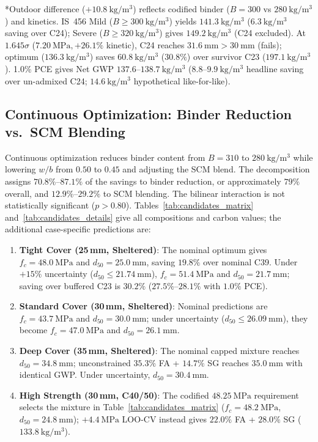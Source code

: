 \documentclass[journal]{IEEEtran}
\begin{document}
\begin{table}[!t]
\begin{minipage}{\textwidth}
\tiny
*Outdoor difference ($+10.8\ \mathrm{kg/m^3}$) reflects codified binder ($B=300$ vs $280\ \mathrm{kg/m^3}$) and kinetics. IS~456 Mild ($B \ge 300\ \mathrm{kg/m^3}$) yields $141.3\ \mathrm{kg/m^3}$ ($6.3\ \mathrm{kg/m^3}$ saving over C24); Severe ($B \ge 320\ \mathrm{kg/m^3}$) gives $149.2\ \mathrm{kg/m^3}$ (C24 excluded). At $1.645\sigma$ ($7.20\ \mathrm{MPa}, +26.1\%$ kinetic), C24 reaches $31.6\ \mathrm{mm} > 30\ \mathrm{mm}$ (fails); optimum ($136.3\ \mathrm{kg/m^3}$) saves $60.8\ \mathrm{kg/m^3}$ ($30.8\%$) over survivor C23 ($197.1\ \mathrm{kg/m^3}$). 1.0\% PCE gives Net GWP $137.6\text{--}138.7\ \mathrm{kg/m^3}$ ($8.8\text{--}9.9\ \mathrm{kg/m^3}$ headline saving over un-admixed C24; $14.6\ \mathrm{kg/m^3}$ hypothetical like-for-like).
\end{minipage}
\end{table}

\subsection{Continuous Optimization: Binder Reduction vs.\ SCM Blending}
Continuous optimization reduces binder content from $B=310$ to $280\ \mathrm{kg/m^3}$ while lowering $w/b$ from $0.50$ to $0.45$ and adjusting the SCM blend. The decomposition assigns $70.8\%\text{--}87.1\%$ of the savings to binder reduction, or approximately $79\%$ overall, and $12.9\%\text{--}29.2\%$ to SCM blending. The bilinear interaction is not statistically significant ($p > 0.80$). Tables~\ref{tab:candidates_matrix} and~\ref{tab:candidates_details} give all compositions and carbon values; the additional case-specific predictions are:
\begin{enumerate}\setlength{\itemsep}{0pt}\setlength{\parskip}{0pt}
    \item \textbf{Tight Cover (25\,mm, Sheltered)}: The nominal optimum gives $f_c=48.0\ \mathrm{MPa}$ and $d_{50}=25.0\ \mathrm{mm}$, saving $19.8\%$ over nominal C39. Under $+15\%$ uncertainty ($d_{50}\le21.74\ \mathrm{mm}$), $f_c=51.4\ \mathrm{MPa}$ and $d_{50}=21.7\ \mathrm{mm}$; saving over buffered C23 is $30.2\%$ ($27.5\%\text{--}28.1\%$ with $1.0\%$ PCE).
    \item \textbf{Standard Cover (30\,mm, Sheltered)}: Nominal predictions are $f_c=43.7\ \mathrm{MPa}$ and $d_{50}=30.0\ \mathrm{mm}$; under uncertainty ($d_{50}\le26.09\ \mathrm{mm}$), they become $f_c=47.0\ \mathrm{MPa}$ and $d_{50}=26.1\ \mathrm{mm}$.
    \item \textbf{Deep Cover (35\,mm, Sheltered)}: The nominal capped mixture reaches $d_{50}=34.8\ \mathrm{mm}$; unconstrained $35.3\%$ FA + $14.7\%$ SG reaches $35.0\ \mathrm{mm}$ with identical GWP. Under uncertainty, $d_{50}=30.4\ \mathrm{mm}$.
    \item \textbf{High Strength (30\,mm, C40/50)}: The codified $48.25\ \mathrm{MPa}$ requirement selects the mixture in Table~\ref{tab:candidates_matrix} ($f_c=48.2\ \mathrm{MPa}$, $d_{50}=24.8\ \mathrm{mm}$); $+4.4\ \mathrm{MPa}$ LOO-CV instead gives $22.0\%$ FA + $28.0\%$ SG ($133.8\ \mathrm{kg/m^3}$).
\end{enumerate}
\end{document}
